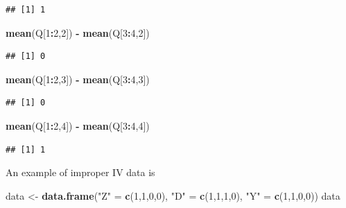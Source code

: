 \documentclass[]{article}
\newenvironment{Shaded}{\begin{snugshade}}{\end{snugshade}}
\newcommand{\KeywordTok}[1]{\textcolor[rgb]{0.13,0.29,0.53}{\textbf{#1}}}
\newcommand{\DecValTok}[1]{\textcolor[rgb]{0.00,0.00,0.81}{#1}}
\newcommand{\StringTok}[1]{\textcolor[rgb]{0.31,0.60,0.02}{#1}}
\newcommand{\OperatorTok}[1]{\textcolor[rgb]{0.81,0.36,0.00}{\textbf{#1}}}
\newcommand{\NormalTok}[1]{#1}
\begin{document}
\begin{verbatim}
## [1] 1
\end{verbatim}

\begin{Shaded}
\begin{Highlighting}[]
\KeywordTok{mean}\NormalTok{(Q[}\DecValTok{1}\OperatorTok{:}\DecValTok{2}\NormalTok{,}\DecValTok{2}\NormalTok{]) }\OperatorTok{-}\StringTok{ }\KeywordTok{mean}\NormalTok{(Q[}\DecValTok{3}\OperatorTok{:}\DecValTok{4}\NormalTok{,}\DecValTok{2}\NormalTok{])}
\end{Highlighting}
\end{Shaded}

\begin{verbatim}
## [1] 0
\end{verbatim}

\begin{Shaded}
\begin{Highlighting}[]
\KeywordTok{mean}\NormalTok{(Q[}\DecValTok{1}\OperatorTok{:}\DecValTok{2}\NormalTok{,}\DecValTok{3}\NormalTok{]) }\OperatorTok{-}\StringTok{ }\KeywordTok{mean}\NormalTok{(Q[}\DecValTok{3}\OperatorTok{:}\DecValTok{4}\NormalTok{,}\DecValTok{3}\NormalTok{])}
\end{Highlighting}
\end{Shaded}

\begin{verbatim}
## [1] 0
\end{verbatim}

\begin{Shaded}
\begin{Highlighting}[]
\KeywordTok{mean}\NormalTok{(Q[}\DecValTok{1}\OperatorTok{:}\DecValTok{2}\NormalTok{,}\DecValTok{4}\NormalTok{]) }\OperatorTok{-}\StringTok{ }\KeywordTok{mean}\NormalTok{(Q[}\DecValTok{3}\OperatorTok{:}\DecValTok{4}\NormalTok{,}\DecValTok{4}\NormalTok{])}
\end{Highlighting}
\end{Shaded}

\begin{verbatim}
## [1] 1
\end{verbatim}

An example of improper IV data is

\begin{Shaded}
\begin{Highlighting}[]
\NormalTok{data <-}\StringTok{ }\KeywordTok{data.frame}\NormalTok{(}\StringTok{"Z"}\NormalTok{ =}\StringTok{ }\KeywordTok{c}\NormalTok{(}\DecValTok{1}\NormalTok{,}\DecValTok{1}\NormalTok{,}\DecValTok{0}\NormalTok{,}\DecValTok{0}\NormalTok{), }\StringTok{"D"}\NormalTok{ =}\StringTok{ }\KeywordTok{c}\NormalTok{(}\DecValTok{1}\NormalTok{,}\DecValTok{1}\NormalTok{,}\DecValTok{1}\NormalTok{,}\DecValTok{0}\NormalTok{), }\StringTok{"Y"}\NormalTok{ =}\StringTok{ }\KeywordTok{c}\NormalTok{(}\DecValTok{1}\NormalTok{,}\DecValTok{1}\NormalTok{,}\DecValTok{0}\NormalTok{,}\DecValTok{0}\NormalTok{))}
\NormalTok{data}
\end{Highlighting}
\end{Shaded}
\end{document}

